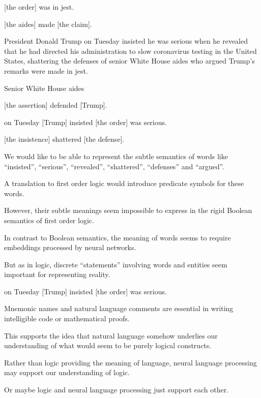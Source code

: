 {{ [the order] was in jest.

 [the aides] made [the claim].
}


{\huge
President Donald Trump on Tuesday insisted he was serious when he %
revealed that he had directed his administration to slow coronavirus %
testing in the United States, shattering the defenses of senior White %
House aides who argued Trump’s remarks were made in jest. %

 Senior White House aides

 [the assertion] defended [Trump].

 on Tuesday [Trump] insisted [the order] was serious.

 [the insistence] shattered [the defense].
}


We would like to be able to represent the subtle semantics of words like ``insisted'', 
``serious'', ``revealed'',
``shattered'', ``defenses'' and ``argued''.

\vfill
A translation to first order logic would introduce predicate symbols for these words.

\vfill
However, their subtle meanings seem impossible to express in the rigid Boolean semantics of first order logic.


In contrast to Boolean semantics, the meaning of words seems to require embeddings processed by neural networks.

\vfill
But as in logic, discrete ``statements'' involving words and entities seem important for representing reality.

 on Tuesday [Trump] insisted [the order] was serious.


Mnemonic names and natural language comments are essential in writing intelligible code or mathematical proofs.

\vfill
This supports the idea that natural language somehow underlies our understanding of what would seem to be purely logical constructs.


\vfill
Rather than logic providing the meaning of language, neural language processing may support our understanding of logic.

\vfill
Or maybe logic and neural language processing just support each other.

}

